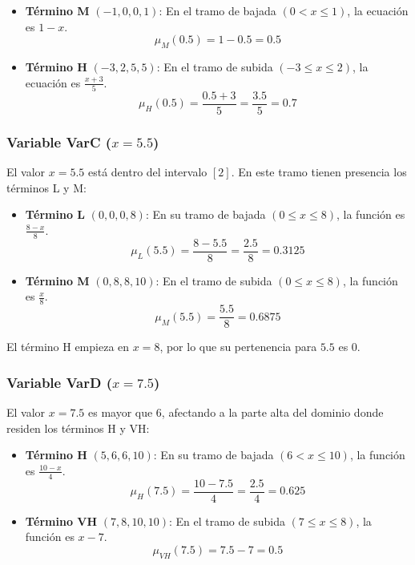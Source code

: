 \documentclass[11pt, a4paper]{article}
\newenvironment{problem}[1][Cuestión]{
	\vspace{0.5cm}
	\noindent{\Large\bfseries #1} \par\vspace{0.5cm}
}{
	\vspace{0.5cm}
}
\begin{document}
\begin{problem}[Problema 2 (60 \%)]
{\begin{itemize}
					\item \textbf{Término M} $(-1, 0, 0, 1)$: En el tramo de bajada $(0 < x \le 1)$, la ecuación es $1-x$.
						\[ \mu_{M}(0.5) = 1 - 0.5 = \mathbf{0.5} \]

					\item \textbf{Término H} $(-3, 2, 5, 5)$: En el tramo de subida $(-3 \le x \le 2)$, la ecuación es $\frac{x+3}{5}$.
						\[ \mu_{H}(0.5) = \frac{0.5+3}{5} = \frac{3.5}{5} = \mathbf{0.7} \]
				\end{itemize}

			\subsubsection*{Variable VarC ($x = 5.5$)}
				El valor $x = 5.5$ está dentro del intervalo $[2]$. En este tramo tienen presencia los términos L y M:

				\begin{itemize}
					\item \textbf{Término L} $(0, 0, 0, 8)$: En su tramo de bajada $(0 \le x \le 8)$, la función es $\frac{8-x}{8}$.
						\[ \mu_{L}(5.5) = \frac{8 - 5.5}{8} = \frac{2.5}{8} = \mathbf{0.3125} \]

					\item \textbf{Término M} $(0, 8, 8, 10)$: En el tramo de subida $(0 \le x \le 8)$, la función es $\frac{x}{8}$.
						\[ \mu_{M}(5.5) = \frac{5.5}{8} = \mathbf{0.6875} \]
				\end{itemize}

				El término H empieza en $x=8$, por lo que su pertenencia para $5.5$ es $0$.

			\subsubsection*{Variable VarD ($x = 7.5$)}
				El valor $x = 7.5$ es mayor que $6$, afectando a la parte alta del dominio donde residen los términos H y VH:

				\begin{itemize}
					\item \textbf{Término H} $(5, 6, 6, 10)$: En su tramo de bajada $(6 < x \le 10)$, la función es $\frac{10-x}{4}$.
						\[ \mu_{H}(7.5) = \frac{10 - 7.5}{4} = \frac{2.5}{4} = \mathbf{0.625} \]

					\item \textbf{Término VH} $(7, 8, 10, 10)$: En el tramo de subida $(7 \le x \le 8)$, la función es $x-7$.
						\[ \mu_{VH}(7.5) = 7.5 - 7 = \mathbf{0.5} \]
				\end{itemize}

}
\end{problem}
\end{document}
